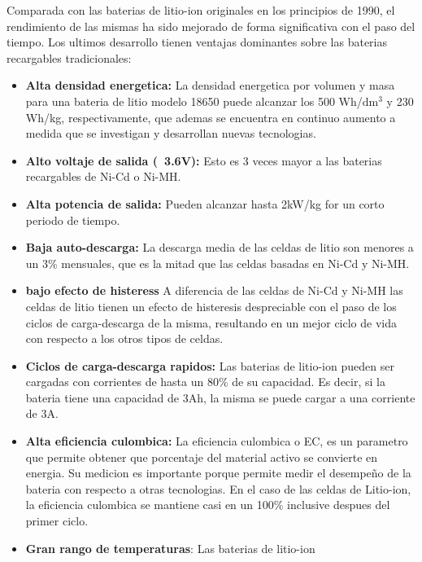 \documentclass[10pt,a4paper]{article}
\begin{document}
    Comparada con las baterias de litio-ion originales en los principios de
    1990, el rendimiento de las mismas ha sido mejorado de forma significativa
    con el paso del tiempo. Los ultimos desarrollo tienen ventajas dominantes
    sobre las baterias recargables tradicionales:
	\begin{itemize}
        \item \textbf{Alta densidad energetica:} La densidad energetica por
            volumen y masa para una bateria de litio modelo 18650 puede alcanzar
            los 500 Wh/$\mathrm{dm^3}$ y 230 Wh/kg, respectivamente, que ademas
            se encuentra en continuo aumento a medida que se investigan y
            desarrollan nuevas tecnologias.
        \item \textbf{Alto voltaje de salida (~3.6V):} Esto es 3 veces mayor a
            las baterias recargables de Ni-Cd o Ni-MH.
        \item \textbf{Alta potencia de salida:} Pueden alcanzar hasta 2kW/kg for
            un corto periodo de tiempo.
        \item \textbf{Baja auto-descarga:} La descarga media de las celdas de
            litio son menores a un 3\% mensuales, que es la mitad que las celdas
            basadas en Ni-Cd y Ni-MH.
        \item \textbf{bajo efecto de histeress} A diferencia de las celdas de
            Ni-Cd y Ni-MH las celdas de litio tienen un efecto de histeresis
            despreciable con el paso de los ciclos de carga-descarga de la
            misma, resultando en un mejor ciclo de vida con respecto a los otros
            tipos de celdas.
        \item \textbf{Ciclos de carga-descarga rapidos:} Las baterias de
            litio-ion pueden ser cargadas con corrientes de hasta un 80\% de su
            capacidad. Es decir, si la bateria tiene una capacidad de 3Ah, la
            misma se puede cargar a una corriente de 3A.
        \item \textbf{Alta eficiencia culombica:} La eficiencia culombica o EC,
            es un parametro que permite obtener que porcentaje del material
            activo se convierte en energia. Su medicion es importante porque 
            permite medir el desempeño de la bateria con respecto a otras 
            tecnologias. En el caso de las celdas de Litio-ion, la eficiencia 
            culombica se mantiene casi en un 100\% inclusive despues del primer
            ciclo.
        \item \textbf{Gran rango de temperaturas}: Las baterias de litio-ion

\end{itemize}
\end{document}
